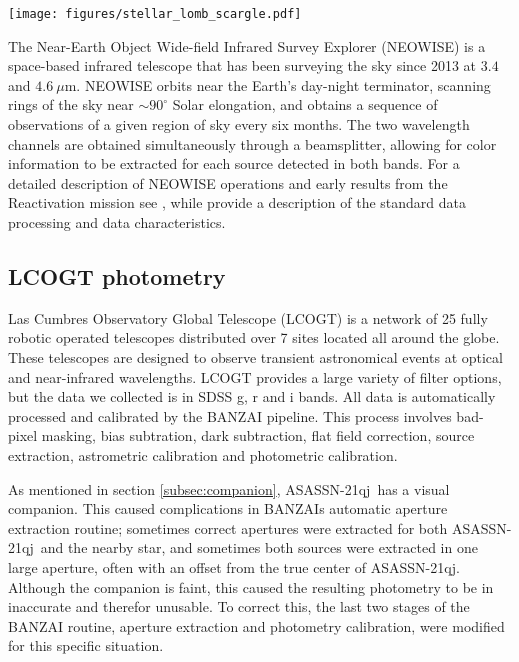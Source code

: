 \documentclass{aa}
\newcommand{\asas}{ASASSN-21qj}
\begin{document}
\begin{figure*}
\begin{centering}
\texttt{[image: figures/stellar\_lomb\_scargle.pdf]}
\caption{ASASSN photometry of \asas\ and the Lomb Scargle periodograms of the photometry in and out of the eclipse.
%
The blue and orange shaded regions in the top panel indicate the range of epochs put into the Lomb Scargle periodogram.
%
Middle panel: The periodograms over a range of 0 to 150 days.
%
Lower panel: The periodogram of the star outside of the eclipse over a range of 0 to 50 days.
}
\label{fig:starlombscargle}
\end{centering}
\end{figure*}
    
The Near-Earth Object Wide-field Infrared Survey Explorer (NEOWISE) is a space-based infrared telescope that has been surveying the sky since 2013 at $3.4$ and $4.6~\mu$m.
%
NEOWISE orbits near the Earth's day-night terminator, scanning rings of the sky near $\sim90^\circ$ Solar elongation, and obtains a sequence of observations of a given region of sky every six months.
%
The two wavelength channels are obtained simultaneously through a beamsplitter, allowing for color information to be extracted for each source detected in both bands.
%
For a detailed description of NEOWISE operations and early results from the Reactivation mission see \citet{mainzer14neowise}, while \citet{cutri15} provide a description of the standard data processing and data characteristics.
%

\subsection{LCOGT photometry}
Las Cumbres Observatory Global Telescope (LCOGT) is a network of 25 fully robotic operated telescopes distributed over 7 sites located all around the globe. These telescopes are designed to observe transient astronomical events at optical and near-infrared wavelengths. LCOGT provides a large variety of filter options, but the data we collected is in SDSS g, r and i bands. All data is automatically processed and calibrated by the BANZAI pipeline. This process involves bad-pixel masking, bias subtration, dark subtraction, flat field correction, source extraction, astrometric calibration and photometric calibration. 

As mentioned in section \ref{subsec:companion}, \asas\ has a visual companion. This caused complications in BANZAIs automatic aperture extraction routine; sometimes correct apertures were extracted for both \asas\ and the nearby star, and sometimes both sources were extracted in one large aperture, often with an offset from the true center of \asas. Although the companion is faint, this caused the resulting photometry to be in inaccurate and therefor unusable. To correct this, the last two stages of the BANZAI routine, aperture extraction and photometry calibration, were modified for this specific situation.
\end{document}
